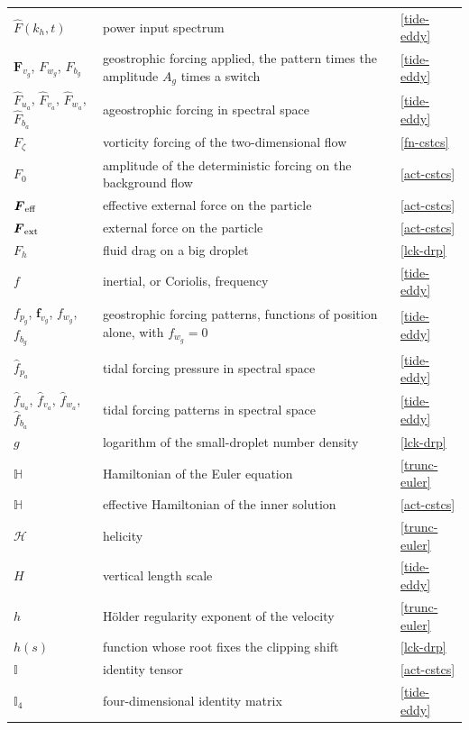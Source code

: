 \begin{longtable}{@{}p{}p{}p{}@{}}
$\widehat{F}(k_h,t)$ & power input spectrum & \ref{tide-eddy} \\
$\boldsymbol{F}_{v_g}$, $F_{w_g}$, $F_{b_g}$ & geostrophic forcing applied, the pattern times the amplitude $A_g$ times a switch & \ref{tide-eddy} \\
$\widehat{F}_{u_a}$, $\widehat{F}_{v_a}$, $\widehat{F}_{w_a}$, $\widehat{F}_{b_a}$ & ageostrophic forcing in spectral space & \ref{tide-eddy} \\
$F_\zeta$ & vorticity forcing of the two-dimensional flow & \ref{fn-cstcs} \\
$F_0$ & amplitude of the deterministic forcing on the background flow & \ref{act-cstcs} \\
$\boldsymbol{F}_{\rm eff}$ & effective external force on the particle & \ref{act-cstcs} \\
$\boldsymbol{F}_{\rm ext}$ & external force on the particle & \ref{act-cstcs} \\
$F_h$ & fluid drag on a big droplet & \ref{lck-drp} \\
$f$ & inertial, or Coriolis, frequency & \ref{tide-eddy} \\
$f_{p_g}$, $\boldsymbol{f}_{v_g}$, $f_{w_g}$, $f_{b_g}$ & geostrophic forcing patterns, functions of position alone, with $f_{w_g} = 0$ & \ref{tide-eddy} \\
$\widehat{f}_{p_a}$ & tidal forcing pressure in spectral space & \ref{tide-eddy} \\
$\widehat{f}_{u_a}$, $\widehat{f}_{v_a}$, $\widehat{f}_{w_a}$, $\widehat{f}_{b_a}$ & tidal forcing patterns in spectral space & \ref{tide-eddy} \\
\addlinespace
$g$ & logarithm of the small-droplet number density & \ref{lck-drp} \\
\addlinespace
$\mathbb{H}$ & Hamiltonian of the Euler equation & \ref{trunc-euler} \\
$\mathbb{H}$ & effective Hamiltonian of the inner solution & \ref{act-cstcs} \\
$\mathcal{H}$ & helicity & \ref{trunc-euler} \\
$H$ & vertical length scale & \ref{tide-eddy} \\
$h$ & H\"older regularity exponent of the velocity & \ref{trunc-euler} \\
$h(s)$ & function whose root fixes the clipping shift & \ref{lck-drp} \\
\addlinespace
$\mathbb{I}$ & identity tensor & \ref{act-cstcs} \\
$\mathbb{I}_4$ & four-dimensional identity matrix & \ref{tide-eddy} \\

\end{longtable}
